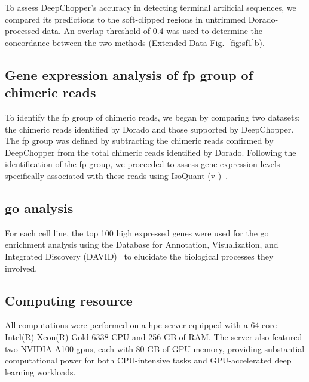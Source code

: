 \documentclass[pdflatex, sn-mathphys-num, lineno]{sn-jnl}%
\newcommand{\edfigref}[2]{Extended Data Fig.~\hyperref[#1]{\ref*{#1}#2}}
\theoremstyle{thmstyleone}%
\theoremstyle{thmstyletwo}%
\theoremstyle{thmstylethree}%
\begin{document}
To assess DeepChopper's accuracy in detecting terminal artificial sequences, we compared its predictions to the soft-clipped regions in untrimmed Dorado-processed data.
An overlap threshold of 0.4 was used to determine the concordance between the two methods (\edfigref{fig:sf1}{b}).



\subsection{Gene expression analysis of \gls{fp} group of chimeric reads}

To identify the \gls{fp} group of chimeric reads, we began by comparing two datasets: the chimeric reads identified by Dorado and those supported by DeepChopper.
The \gls{fp} group was defined by subtracting the chimeric reads confirmed by DeepChopper from the total chimeric reads identified by Dorado.
Following the identification of the \gls{fp} group, we proceeded to assess gene expression levels specifically associated with these reads using IsoQuant (v )~\cite{prjibelski2023accurate}.


\subsection{\gls{go} analysis}

For each cell line, the top 100 high expressed genes were used for the \gls{go} enrichment analysis using the Database for Annotation, Visualization, and Integrated Discovery (DAVID)~\cite{sherman2022david} to elucidate the biological processes they involved.

\subsection{Computing resource}

All computations were performed on a \gls{hpc} server equipped with a 64-core Intel(R) Xeon(R) Gold 6338 CPU and 256 GB of RAM.
The server also featured two NVIDIA A100 \glspl{gpu}, each with 80 GB of GPU memory, providing substantial computational power for both CPU-intensive tasks and GPU-accelerated deep learning workloads.



\end{document}
